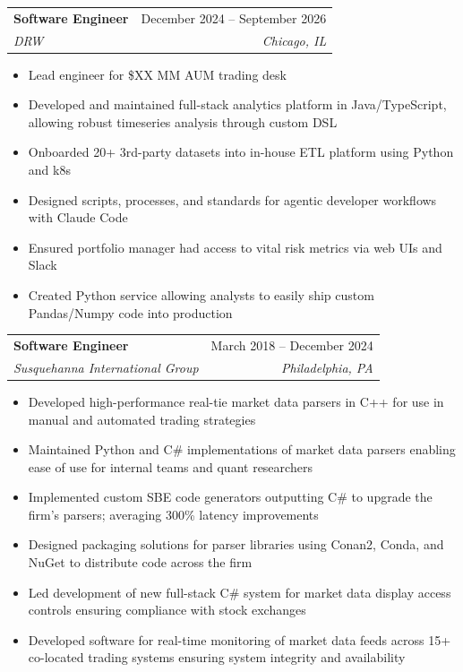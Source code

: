 \documentclass[letterpaper,10pt]{article}
\makeatletter
\newcommand{\resumeItem}[1]{
  \item\small{
    {#1 \vspace{-2pt}}
  }
}
\newcommand{\resumeSubheading}[4]{
  \vspace{-2pt}\item
    \begin{tabular*}{0.97\textwidth}[t]{l@{\extracolsep{\fill}}r}
      \textbf{#1} & #2 \\
      \textit{\small#3} & \textit{\small #4} \\
    \end{tabular*}\vspace{-7pt}
}
\newcommand{\resumeSubSubheading}[2]{
    \item
    \begin{tabular*}{0.97\textwidth}{l@{\extracolsep{\fill}}r}
      \textit{\small#1} & \textit{\small #2} \\
    \end{tabular*}\vspace{-7pt}
}
\newcommand{\resumeSubHeadingListEnd}{\end{itemize}}
\newcommand{\resumeItemListStart}{\begin{itemize}}
\newcommand{\resumeItemListEnd}{\end{itemize}\vspace{-5pt}}
\makeatother
\begin{document}
        \resumeSubheading
            {Software Engineer}{December 2024 -- September 2026}
            {DRW}{Chicago, IL}
            \resumeItemListStart
                \resumeItem{Lead engineer for \$XX MM AUM trading desk}
                \resumeItem{Developed and maintained full-stack analytics platform in Java/TypeScript, allowing robust timeseries analysis through custom DSL}
                \resumeItem{Onboarded 20+ 3rd-party datasets into in-house ETL platform using Python and k8s}
                \resumeItem{Designed scripts, processes, and standards for agentic developer workflows with Claude Code}
                \resumeItem{Ensured portfolio manager had access to vital risk metrics via web UIs and Slack}
                \resumeItem{Created Python service allowing analysts to easily ship custom Pandas/Numpy code into production}
            \resumeItemListEnd
        

        \resumeSubheading
            {Software Engineer}{March 2018 -- December 2024}
            {Susquehanna International Group}{Philadelphia, PA}
            \resumeItemListStart
                \resumeItem{Developed high-performance real-tie market data parsers in C++ for use in manual and automated trading strategies}
                \resumeItem{Maintained Python and C\# implementations of market data parsers enabling ease of use for internal teams and quant researchers}
                \resumeItem{Implemented custom SBE code generators outputting C\# to upgrade the firm's parsers; averaging 300\% latency improvements}
                \resumeItem{Designed packaging solutions for parser libraries using Conan2, Conda, and NuGet to distribute code across the firm}
                \resumeItem{Led development of new full-stack C\# system for market data display access controls ensuring compliance with stock exchanges}
                \resumeItem{Developed software for real-time monitoring of market data feeds across 15+ co-located trading systems ensuring system integrity and availability}
        \resumeItemListEnd
\end{document}
